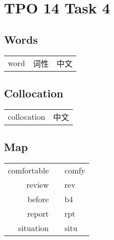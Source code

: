 \section{TPO 14 Task 4}

\subsection{Words}

\begin{tabular}{lll}
    word & 词性 & 中文 \\
\end{tabular}

\subsection{Collocation}

\begin{tabular}{ll}
    collocation & 中文 \\
\end{tabular}

\subsection{Map}

\begin{tabular}{rc@{\quad$\to$\quad}l}
    comfortable &  & comfy \\
    review      &  & rev   \\
    before      &  & b4    \\
    report      &  & rpt   \\
    situation   &  & situ  \\
\end{tabular}

\newpage
